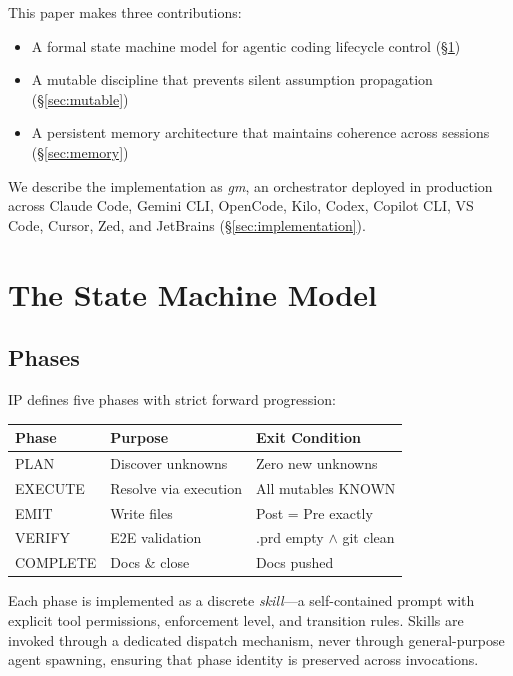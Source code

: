 \documentclass[11pt,twocolumn]{article}
\begin{document}
This paper makes three contributions:

\begin{itemize}[nosep]
    \item A formal state machine model for agentic coding lifecycle control (\S\ref{sec:statemachine})
    \item A mutable discipline that prevents silent assumption propagation (\S\ref{sec:mutable})
    \item A persistent memory architecture that maintains coherence across sessions (\S\ref{sec:memory})
\end{itemize}

We describe the implementation as \emph{gm}, an orchestrator deployed in production across Claude Code, Gemini CLI, OpenCode, Kilo, Codex, Copilot CLI, VS Code, Cursor, Zed, and JetBrains (\S\ref{sec:implementation}).

\section{The State Machine Model}
\label{sec:statemachine}

\subsection{Phases}

IP defines five phases with strict forward progression:

\begin{table}[h]
\centering
\small
\begin{tabular}{@{}lll@{}}
\toprule
\textbf{Phase} & \textbf{Purpose} & \textbf{Exit Condition} \\
\midrule
PLAN & Discover unknowns & Zero new unknowns \\
EXECUTE & Resolve via execution & All mutables KNOWN \\
EMIT & Write files & Post = Pre exactly \\
VERIFY & E2E validation & .prd empty $\wedge$ git clean \\
COMPLETE & Docs \& close & Docs pushed \\
\bottomrule
\end{tabular}
\end{table}

Each phase is implemented as a discrete \emph{skill}---a self-contained prompt with explicit tool permissions, enforcement level, and transition rules. Skills are invoked through a dedicated dispatch mechanism, never through general-purpose agent spawning, ensuring that phase identity is preserved across invocations.
\end{document}
